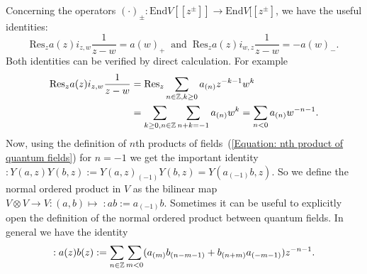 Concerning the operators $(\cdot)_\pm:\text{End}V[[z^\pm]]\rightarrow\text{End}V[[z^\pm]$, we have the useful identities:
\begin{equation}
    \text{Res}_za(z)i_{z,w}\frac{1}{z-w}=a(w)_+\;\;\text{and}\;\;\text{Res}_za(z)i_{w,z}\frac{1}{z-w}=-a(w)_-.
\end{equation}
Both identities can be verified by direct calculation. For example
\begin{equation}
    \begin{split}
         \text{Res}_za(z)i_{z,w}\frac{1}{z-w}&=\text{Res}_z\sum_{n\in\mathbb{Z},k\geq0}a_{(n)}z^{-k-1}w^k\\
         &=\sum_{k\geq0,n\in\mathbb{Z}}\sum_{n+k=-1}a_{(n)}w^k=\sum_{n<0}a_{(n)}w^{-n-1}.      
    \end{split}
\end{equation}
Now, using the definition of $n$th products of fields~(\ref{Equation: nth product of quantum fields}) for $n=-1$ we get the important identity $:Y(a,z)Y(b,z):=Y(a,z)_{(-1)}Y(b,z)=Y(a_{(-1)}b,z)$. So we define the normal ordered product in $V$ as the bilinear map $V\otimes V\rightarrow V:(a,b)\mapsto\; :ab:= a_{(-1)}b$. Sometimes it can be useful to explicitly open the definition of the normal ordered product between quantum fields. In general we have the identity
\begin{equation}\label{Equation: normal ordered product between quantum fields}
    :a(z)b(z):=\sum_{n\in\mathbb{Z}}\sum_{m<0}(a_{(m)}b_{(n-m-1)}+b_{(n+m)}a_{(-m-1)}) z^{-n-1}.
\end{equation}

